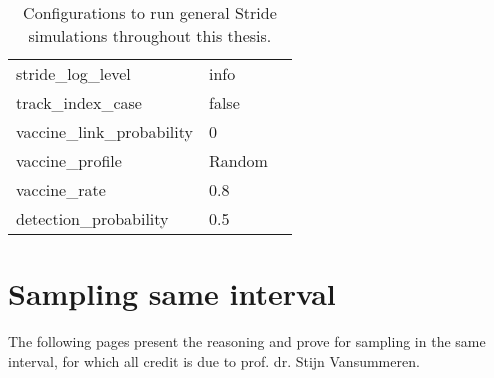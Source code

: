 \begin{appendices}
\begin{table}
\begin{tabular}{@{}lll@{}}
stride\_log\_level & info &  \\
track\_index\_case & false &  \\
vaccine\_link\_probability & 0 &  \\
vaccine\_profile & Random &  \\
vaccine\_rate & 0.8 &  \\
detection\_probability & 0.5 &  \\ \bottomrule
\end{tabular}
\caption{Configurations to run general Stride simulations throughout this thesis.}
\label{tab:configurations}
\end{table}

\chapter{Sampling same interval}
\label{appendix:sampling_same_interval}
The following pages present the reasoning and prove for sampling in the same interval, for which all credit is due to prof. dr. Stijn Vansummeren.



\end{appendices}
